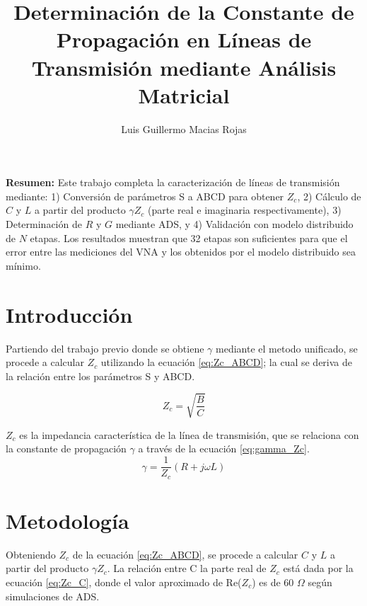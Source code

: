 \documentclass{article}   %
\title{Determinación de la Constante de Propagación en Líneas de Transmisión mediante Análisis Matricial}
\author{Luis Guillermo Macias Rojas}
\theoremstyle{mytheoremstyle}
\theoremstyle{mytheoremstyle}
\theoremstyle{myproblemstyle}
\begin{document}
    \maketitle

    \selectfont %
    \noindent
    \textbf{Resumen:} Este trabajo completa la caracterización de líneas de transmisión mediante: 1) Conversión de parámetros S a ABCD 
    para obtener $Z_c$, 2) Cálculo de $C$ y $L$ a partir del producto $\gamma Z_c$ (parte real e imaginaria respectivamente), 3) Determinación de $R$ y $G$ mediante ADS, y 4) 
    Validación con modelo distribuido de $N$ etapas. Los resultados muestran que 32 etapas son suficientes para que el error entre las 
    mediciones del VNA y los obtenidos por el modelo distribuido sea mínimo.

    \noindent\begin{minipage}{0.49\textwidth}   %
        {\centering\section*{\large Introducción}}

        Partiendo del trabajo previo donde se obtiene $\gamma$ mediante el metodo unificado, se procede a calcular $Z_c$ utilizando la 
        ecuación \eqref{eq:Zc_ABCD}; la cual se deriva de la relación entre los parámetros S y ABCD.
        
        \begin{equation}
            Z_c = \sqrt{\frac{B}{C}}
            \label{eq:Zc_ABCD}
        \end{equation}

        $Z_c$ es la impedancia característica de la línea de transmisión, que se relaciona con la constante de propagación $\gamma$ a través de la ecuación \eqref{eq:gamma_Zc}.
        \begin{equation}
            \gamma = \frac{1}{Z_c}\left(R + j\omega L\right)
            \label{eq:gamma_Zc}
        \end{equation}

        {\centering\section*{\large Metodología}}

        Obteniendo $Z_c$ de la ecuación \eqref{eq:Zc_ABCD}, se procede a calcular $C$ y $L$ a partir del producto $\gamma Z_c$.
        La relación entre C la parte real de $Z_c$ está dada por la ecuación \eqref{eq:Zc_C}, donde el valor aproximado de Re($Z_c$)
        es de 60 $\Omega$ según simulaciones de ADS.


\end{minipage}
\end{document}
